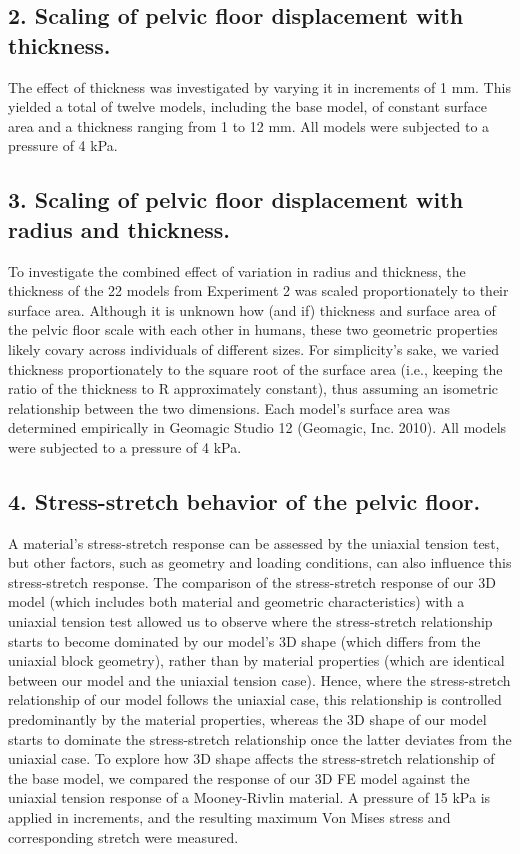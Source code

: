 \documentclass[9pt,twocolumn,twoside]{pnas-new}
\begin{document}
\subsection*{2. Scaling of pelvic floor displacement with thickness.} The effect of thickness was investigated by varying it in increments of 1 mm. This yielded a total of twelve models, including the base model, of constant surface area and a thickness ranging from 1 to 12 mm. All models were subjected to a pressure of 4 kPa. 
\subsection*{3. Scaling of pelvic floor displacement with radius and thickness.} To investigate the combined effect of variation in radius and thickness, the thickness of the 22 models from Experiment 2 was scaled proportionately to their surface area. Although it is unknown how (and if) thickness and surface area of the pelvic floor scale with each other in humans, these two geometric properties likely covary across individuals of different sizes. For simplicity’s sake, we varied thickness proportionately to the square root of the surface area (i.e., keeping the ratio of the thickness to R approximately constant), thus assuming an isometric relationship between the two dimensions. Each model’s surface area was determined empirically in Geomagic Studio 12 (Geomagic, Inc. 2010). All models were subjected to a pressure of 4 kPa.
\subsection*{4. Stress-stretch behavior of the pelvic floor.} A material’s stress-stretch response can be assessed by the uniaxial tension test, but other factors, such as geometry and loading conditions, can also influence this stress-stretch response. The comparison of the stress-stretch response of our 3D model (which includes both material and geometric characteristics) with a uniaxial tension test allowed us to observe where the stress-stretch relationship starts to become dominated by our model’s 3D shape (which differs from the uniaxial block geometry), rather than by material properties (which are identical between our model and the uniaxial tension case). Hence, where the stress-stretch relationship of our model follows the uniaxial case, this relationship is controlled predominantly by the material properties, whereas the 3D shape of our model starts to dominate the stress-stretch relationship once the latter deviates from the uniaxial case. To explore how 3D shape affects the stress-stretch relationship of the base model, we compared the response of our 3D FE model against the uniaxial tension response of a Mooney-Rivlin material. A pressure of 15 kPa is applied in increments, and the resulting maximum Von Mises stress and corresponding stretch were measured. 
\end{document}
